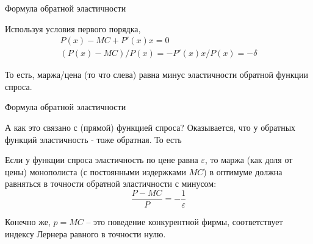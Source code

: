 \documentclass{beamer}
\begin{document}
\begin{frame}{Формула обратной эластичности}

Используя условия первого порядка,
\begin{gather*}
P(x) - MC + P'(x)x = 0\\
(P(x) - MC)/P(x) = - P'(x)x/P(x) = - \delta
\end{gather*}

То есть, маржа/цена (то что слева) равна минус эластичности обратной функции спроса.
\end{frame}

\begin{frame}{Формула обратной эластичности}

А как это связано с (прямой) функцией спроса? Оказывается, что у обратных функций эластичность - тоже обратная. То есть 

\begin{lemma}
Если у функции спроса эластичность по цене равна $\varepsilon$, то маржа (как доля от цены) монополиста (с постоянными издержками $MC$) в оптимуме должна равняться в точности обратной эластичности с минусом:
$$\frac{P-MC}{P} = - \frac{1}{\varepsilon}$$
\end{lemma}
Конечно же, $p=MC$ – это поведение конкурентной фирмы, соответствует индексу Лернера равного в точности нулю.
\end{frame}
%
%
%
%
%
%
%
%
%
%
%
\end{document}

